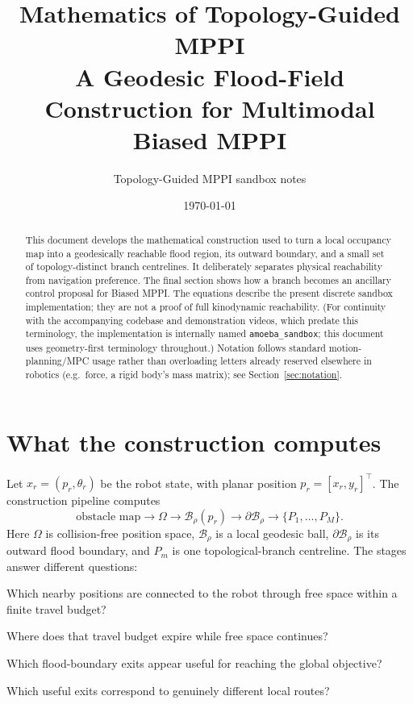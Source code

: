 \documentclass[11pt,a4paper]{article}
\title{Mathematics of Topology-Guided MPPI\\
\large A Geodesic Flood-Field Construction for Multimodal Biased MPPI}
\author{Topology-Guided MPPI sandbox notes}
\date{\today}
\newcommand{\Free}{\Omega}
\newcommand{\B}{\mathcal{B}}
\begin{document}
\maketitle

\begin{abstract}
This document develops the mathematical construction used to turn a local
occupancy map into a geodesically reachable flood region, its outward
boundary, and a small set of topology-distinct branch centrelines. It
deliberately separates physical reachability from navigation preference. The
final section shows how a branch becomes an ancillary control proposal for
Biased MPPI. The equations describe the present discrete sandbox
implementation; they are not a proof of full kinodynamic reachability.
(For continuity with the accompanying codebase and demonstration videos,
which predate this terminology, the implementation is internally named
\texttt{amoeba\_sandbox}; this document uses geometry-first terminology
throughout.) Notation follows standard motion-planning/MPC usage rather than
overloading letters already reserved elsewhere in robotics (e.g.\ force,
a rigid body's mass matrix); see Section~\ref{sec:notation}.
\end{abstract}

\tableofcontents
\newpage

\section{What the construction computes}

Let $x_r=(p_r,\theta_r)$ be the robot state, with planar position
$p_r=[x_r,y_r]^\top$. The construction pipeline computes
\begin{equation}
\text{obstacle map}
\longrightarrow \Free
\longrightarrow \B_\rho(p_r)
\longrightarrow \partial\B_\rho
\longrightarrow \{P_1,\ldots,P_M\}.
\end{equation}
Here $\Free$ is collision-free position space, $\B_\rho$ is a local geodesic
ball, $\partial\B_\rho$ is its outward flood boundary, and $P_m$ is one topological-branch
centreline. The stages answer different questions:
\begin{description}[leftmargin=3.1cm,style=nextline]
  \item[Body] Which nearby positions are connected to the robot through free
  space within a finite travel budget?
  \item[Flood boundary] Where does that travel budget expire while free space
  continues?
  \item[Navigation field] Which flood-boundary exits appear useful for
  reaching the global objective?
  \item[Topological branches] Which useful exits correspond to genuinely
  different local routes?
\end{description}
\end{document}
